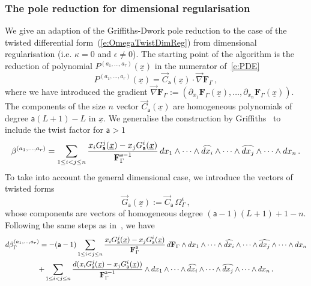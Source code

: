 \documentclass[a4paper,12pt]{article}
\numberwithin{equation}{section}
\numberwithin{figure}{section}
\begin{document}
  \subsubsection{The pole reduction for dimensional
    regularisation}\label{sec:PoleRed}
We give an adaption of the Griffiths-Dwork pole reduction to the case
of the twisted differential form~(\ref{e:OmegaTwistDimReg}) from
dimensional regularisation (i.e. $\kappa=0$ and $\epsilon\neq0$).
The starting point of the algorithm is the reduction of polynomial
$P^{(a_1,\dots,a_r)}(\underline x)$  in the numerator
of~\eqref{e:PDE}
\begin{equation}\label{e:RedF}
	P^{(a_1,\dots,a_r)}(\underline x) = \vec C_{\mathsf{a}}(\underline x)\cdot
	\vec\nabla   \textbf{F}_\Gamma \, ,
      \end{equation}
      where we have introduced the gradient $	\vec\nabla   \textbf{F}_\Gamma :=\left(\partial_{x_1}
      \textbf{F}_\Gamma(\underline x),\dots, \partial_{x_n}
      \textbf{F}_\Gamma(\underline x)\right)$.
%
The components of the size $n$ vector $ \vec C_{\mathsf{a}}(\underline x)$ are homogeneous polynomials of degree
$\mathsf{a}(L+1)-L$ in  $\underline x$. 
%
   We generalise the construction by
   Griffiths~\cite{Griffith1,Griffith2} to include the twist factor
   for $\mathsf{a}>1$ 
   \begin{equation}\label{e:betadef}
  \beta^{(a_1,\dots,a_r)}=  \sum_{1\leq i<j\leq n} {x_i
    G_{\mathsf{a}}^j  (\underline x)-x_j
   G_{\mathsf{a}}^i(\underline x)\over
  \textbf{F}_\Gamma^{\mathsf{a}-1}}\, 
 dx_1\wedge \cdots \wedge \widehat{dx_i}\wedge \cdots \wedge\widehat{dx_j}\wedge
  \cdots \wedge dx_n \, .
\end{equation}
To take into account the general dimensional case, we introduce 
the vectors of twisted forms
\begin{equation}
  \label{e:Gdef}
\vec  G_{\mathsf{a}}(\underline x):=   \vec C_{\mathsf{a}} \,\Omega_\Gamma^\epsilon \, ,
\end{equation}
whose components are vectors of homogeneous degree $(\mathsf{a}-1)(L+1)+1-n$. 
Following the same steps as in~\cite{Griffiths_1969}, we have
\begin{multline}
  d\beta_\Gamma^{(a_1,\dots,a_r)}=-  (\mathsf{a}-1) \sum_{1\leq i<j\leq n} {x_i
    G_{\mathsf{a}}^j  (\underline x)-x_j
   G_{\mathsf{a}}^i(\underline x)\over
   \textbf{F}_\Gamma^{\mathsf{a}}}\, d \textbf{F}_\Gamma\wedge
 dx_1\wedge \cdots \wedge \widehat{dx_i}\wedge \cdots \wedge\widehat{dx_j}\wedge
 \cdots \wedge dx_n \cr
+  \sum_{1\leq i<j\leq n} {d(x_i
    G_{\mathsf{a}}^j  (\underline x)-x_j
   G_{\mathsf{a}}^i(\underline x))\over
   \textbf{F}_\Gamma^{\mathsf{a}-1}}\wedge
 dx_1\wedge \cdots \wedge \widehat{dx_i}\wedge \cdots \wedge\widehat{dx_j}\wedge
  \cdots \wedge dx_n  \, .
\end{multline}
\end{document}
